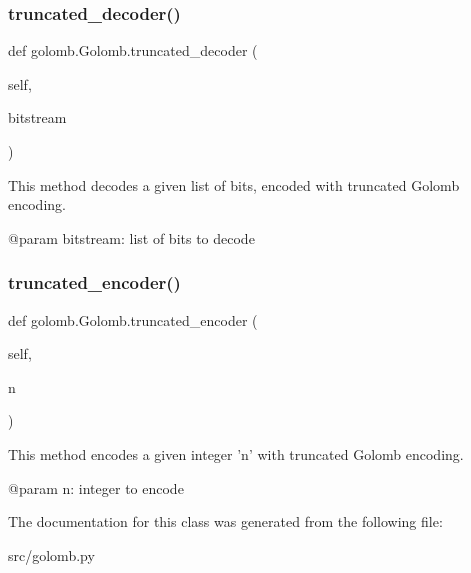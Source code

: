 \subsubsection{\texorpdfstring{truncated\+\_\+decoder()}{truncated\_decoder()}}
{\footnotesize\ttfamily def golomb.\+Golomb.\+truncated\+\_\+decoder (\begin{DoxyParamCaption}\item[{}]{self,  }\item[{}]{bitstream }\end{DoxyParamCaption})}

\begin{DoxyVerb}This method decodes a given list of bits, encoded with truncated Golomb encoding.

@param bitstream: list of bits to decode
\end{DoxyVerb}
 \mbox{\label{classgolomb_1_1Golomb_a661925e0fedeca864a7fa7e2bddf84d5}} 
\subsubsection{\texorpdfstring{truncated\+\_\+encoder()}{truncated\_encoder()}}
{\footnotesize\ttfamily def golomb.\+Golomb.\+truncated\+\_\+encoder (\begin{DoxyParamCaption}\item[{}]{self,  }\item[{}]{n }\end{DoxyParamCaption})}

\begin{DoxyVerb}This method encodes a given integer 'n' with truncated Golomb encoding.

@param n: integer to encode
\end{DoxyVerb}
 

The documentation for this class was generated from the following file\+:\begin{DoxyCompactItemize}
\item 
src/golomb.\+py\end{DoxyCompactItemize}
